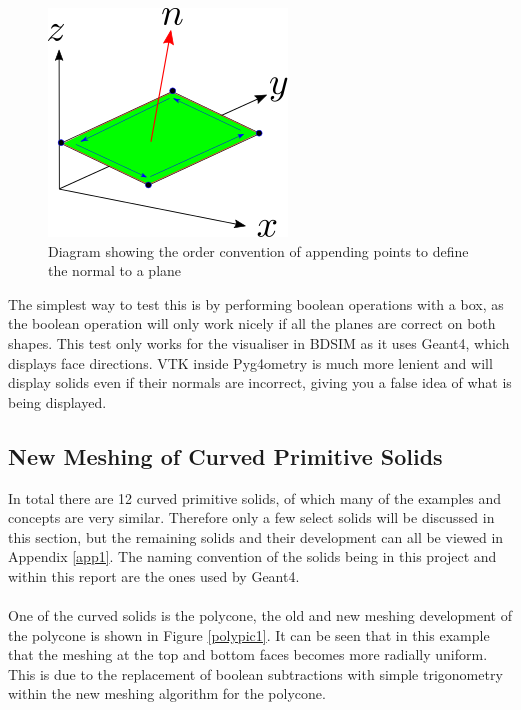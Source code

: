 \documentclass[12pt,a4paper]{article}
\begin{document}
\begin{figure}[h!]
\centering
\includegraphics[scale=0.75]{Images//append_points//Point_Appending_Order.png}
\caption[width=\columnwidth]{Diagram showing the order convention of appending points to define the normal to a plane}
\label{pointsorder}
\end{figure}
\noindent The simplest way to test this is by performing boolean operations with a box, as the boolean operation will only work nicely if all the planes are correct on both shapes. This test only works for the visualiser in BDSIM as it uses Geant4, which displays face directions. VTK inside Pyg4ometry is much more lenient and will display solids even if their normals are incorrect, giving you a false idea of what is being displayed.

\subsection{New Meshing of Curved Primitive Solids}
In total there are 12 curved primitive solids, of which many of the examples and concepts are very similar. Therefore only a few select solids will be discussed in this section, but the remaining solids and their development can all be viewed in Appendix \ref{app1}. The naming convention of the solids being in this project and within this report are the ones used by Geant4.
\\\\
One of the curved solids is the polycone, the old and new meshing development of the polycone is shown in Figure \ref{polypic1}. It can be seen that in this example that the meshing at the top and bottom faces becomes more radially uniform. This is due to the replacement of boolean subtractions with simple trigonometry within the new meshing algorithm for the polycone.
\end{document}
